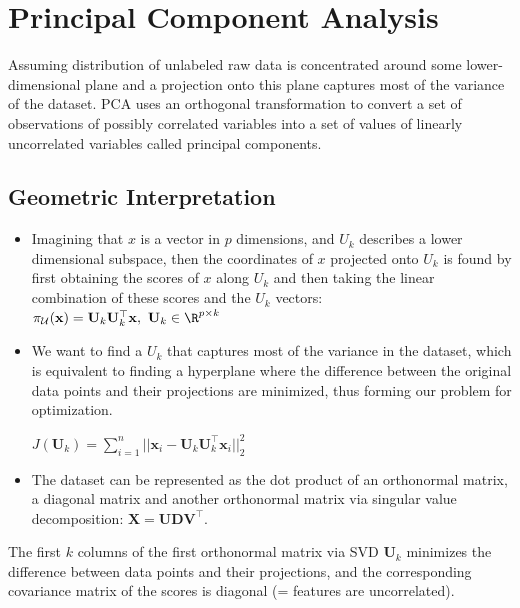 \documentclass[english]{latex4ei/latex4ei_sheet}
\begin{document}
\newpage
\section{Principal Component Analysis}
\begin{sectionbox}
Assuming distribution of unlabeled raw data is concentrated around some lower-dimensional plane and a projection onto this plane captures most of the variance of the dataset. PCA uses an orthogonal transformation to convert a set of observations of possibly correlated variables into a set of values of linearly uncorrelated variables called principal components.\\
\subsection{Geometric Interpretation}
\begin{itemize}
\item Imagining that $x$ is a vector in $p$ dimensions, and $U_k$ describes a lower dimensional subspace, then the coordinates of $x$ projected onto $U_k$ is found by first obtaining the scores of $x$ along $U_k$ and then taking the linear combination of these scores and the $U_k$ vectors: $\pi_\mathcal{U}(\mathbf{x})=\mathbf{U}_k\mathbf{U}_k^{\top}\mathbf{x}, \ \mathbf{U}_k\in\R^{p\times k}$
\item We want to find a $U_k$ that captures most of the variance in the dataset, which is equivalent to finding a hyperplane where the difference between the original data points and their projections are minimized, thus forming our problem for optimization.\\
\begin{center}
    $J(\mathbf{U}_k)=\sum\limits_{i=1}^n||\mathbf{x}_i-\mathbf{U}_k\mathbf{U}_k^{\top}\mathbf{x}_i||^2_2$
\end{center}
\item The dataset can be represented as the dot product of an orthonormal matrix, a diagonal matrix and another orthonormal matrix via singular value decomposition: $\mathbf{X}=\mathbf{UDV}^{\top}$.
\end{itemize}
\begin{emphbox}
    The first $k$ columns of the first orthonormal matrix via SVD $\mathbf{U}_k$ minimizes the difference between data points and their projections, and the corresponding covariance matrix of the scores is diagonal (= features are uncorrelated).
\end{emphbox}
\begin{itemize}

\end{itemize}
\end{sectionbox}
\end{document}
